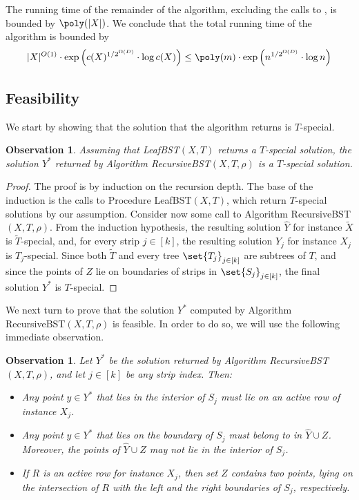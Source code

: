 \documentclass[11pt]{article}
\numberwithin{equation}{section}
\theoremstyle{definition}
\theoremstyle{plain}
\newtheorem{myobs}[theorem]{Observation}
\begin{document}
The running time of the remainder of the algorithm, excluding the calls to \leafBST, is bounded by $\poly(|X|)$. We conclude that the total running time of the algorithm is bounded by 
\[|X|^{O(1)}\cdot \exp\left({c(X)^{1/2^{\Omega(D)}}\cdot \log c(X)}\right )\leq \poly(m)\cdot \exp\left(n^{1/2^{\Omega(D)}}\cdot \log n \right )\] 


\subsection{Feasibility} 

We start by showing that the solution that the algorithm returns is $T$-special.

\begin{myobs}\label{obs: get special sol}
Assuming that {\sc LeafBST}$(X,T)$ returns a $T$-special solution, the solution $Y^*$ returned by Algorithm {\sc RecursiveBST}$(X,T,\rho)$ is  a $T$-special solution. 
\end{myobs}

\begin{proof}
    The proof is by induction on the recursion depth. The base of the induction is the calls to Procedure {\sc LeafBST}$(X,T)$, which return $T$-special solutions by our assumption.
Consider now some call to Algorithm {\sc RecursiveBST}$(X,T,\rho)$. From the induction hypothesis, the resulting solution $\hat{Y}$ for instance $\widetilde{X}$ is $\widetilde{T}$-special, and, for every strip $j \in [k]$, the resulting solution $Y_j$ for instance $X_j$ is $T_j$-special. 
Since both $\widetilde{T}$ and every tree $\set{T_j}_{j \in [k]}$ are subtrees of $T$, and since the points of $Z$ lie on boundaries of strips in $\set{S_j}_{j\in[k]}$, the final solution $Y^*$ is $T$-special. 
\end{proof}


%
%
%
%


We next turn to prove that the solution $Y^*$ computed by Algorithm {\sc RecursiveBST}$(X,T,\rho)$ is feasible. In order to do so, we will use the following immediate observation.



%
\begin{myobs}
	\label{obs:points structure} 
	Let $Y^*$ be the solution returned by Algorithm {\sc RecursiveBST}$(X,T,\rho)$, and let $j \in [k]$ be any strip index. Then:
	\begin{itemize}
		\item Any point $y\in Y^*$ that lies in the interior of $S_j$ must lie on an active row of instance $X_j$.
		\item Any point $y\in Y^*$ that lies on the boundary of $S_j$ must belong to in $\hat{Y}\cup Z$. Moreover, the points of $\hat{Y} \cup Z$ may not lie in the interior of $S_j$. 
\item If $R$ is an active row for instance $X_j$, then set $Z$ contains two points, lying on the intersection of $R$ with the left and the right boundaries of $S_j$, respectively.
		
%
	\end{itemize}
\end{myobs}
\end{document}

